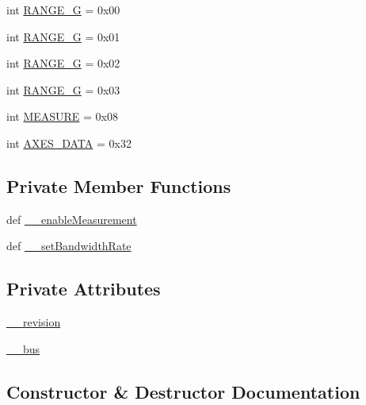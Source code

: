 \begin{DoxyCompactItemize}
\item 
int \hyperlink{classconcretesensor_1_1adxl345_1_1ADXL345_a123d3ece22ae776bb88e4229ddb06541}{R\+A\+N\+G\+E\+\_\+G} = 0x00
\item 
int \hyperlink{classconcretesensor_1_1adxl345_1_1ADXL345_a80fb486130388632a4048569d6fb8415}{R\+A\+N\+G\+E\+\_\+G} = 0x01
\item 
int \hyperlink{classconcretesensor_1_1adxl345_1_1ADXL345_a63e47a2b37c847774620864dd52a8814}{R\+A\+N\+G\+E\+\_\+G} = 0x02
\item 
int \hyperlink{classconcretesensor_1_1adxl345_1_1ADXL345_a914a0231fa0d8d8a26f337133b9cbcd4}{R\+A\+N\+G\+E\+\_\+G} = 0x03
\item 
int \hyperlink{classconcretesensor_1_1adxl345_1_1ADXL345_a6c758cfe63cd94cb594b6305f2899b65}{M\+E\+A\+S\+U\+R\+E} = 0x08
\item 
int \hyperlink{classconcretesensor_1_1adxl345_1_1ADXL345_a30d4c73d19d3d55a9d50a66681e34a60}{A\+X\+E\+S\+\_\+\+D\+A\+T\+A} = 0x32
\end{DoxyCompactItemize}
\subsection*{Private Member Functions}
\begin{DoxyCompactItemize}
\item 
def \hyperlink{classconcretesensor_1_1adxl345_1_1ADXL345_a8075c22f0a67207152b02ed916fbb31c}{\+\_\+\+\_\+enable\+Measurement}
\item 
def \hyperlink{classconcretesensor_1_1adxl345_1_1ADXL345_a105ef7732bb5c186a53f974071c02a75}{\+\_\+\+\_\+set\+Bandwidth\+Rate}
\end{DoxyCompactItemize}
\subsection*{Private Attributes}
\begin{DoxyCompactItemize}
\item 
\hyperlink{classconcretesensor_1_1adxl345_1_1ADXL345_a5d55e6e3f8b4728001c46b471cc6cb68}{\+\_\+\+\_\+revision}
\item 
\hyperlink{classconcretesensor_1_1adxl345_1_1ADXL345_a36a6c35010748bad03934005b574767d}{\+\_\+\+\_\+bus}
\end{DoxyCompactItemize}


\subsection{Constructor \& Destructor Documentation}
\hypertarget{classconcretesensor_1_1adxl345_1_1ADXL345_a4106f22a9a857f49602cd109141a953b}{}
